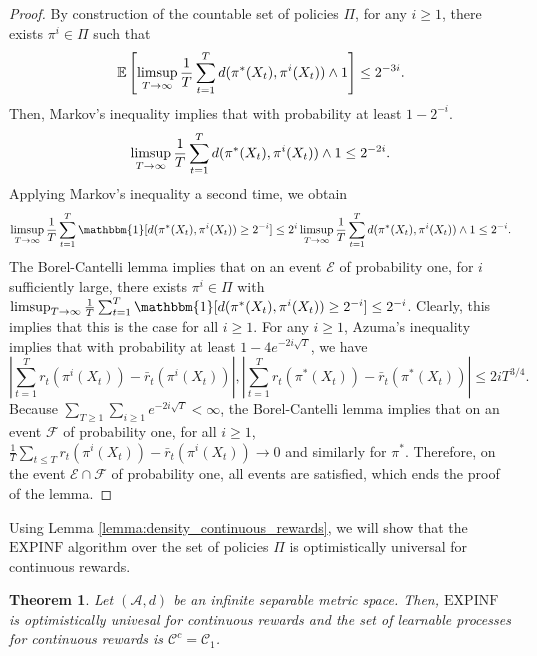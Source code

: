 \documentclass[aos]{imsart}
\theoremstyle{plain}
\newtheorem{theorem}{Theorem}[section]
\theoremstyle{remark}
\newcommand{\Acal}{\mathcal{A}}
\newcommand{\Ccal}{\mathcal{C}}
\newcommand{\Ecal}{\mathcal{E}}
\newcommand{\Fcal}{\mathcal{F}}
\newcommand{\Ebb}{\mathbb{E}}
\newcommand{\1}{\mathbbm{1}}%
\newcommand{\EXPINF}{\mathrm{EXPINF}}
\renewcommand{\limsup}{\mathop{\rm limsup}}
\begin{document}
\begin{proof}
By construction of the countable set of policies $\Pi$, for any $i\geq 1$, there exists $\pi^i\in \Pi$ such that
\begin{equation*}
    \Ebb\left[\limsup_{T\to\infty}\frac{1}{T}\sum_{t=1}^T d(\pi^*(X_t),\pi^i(X_t))\wedge 1\right] \leq 2^{-3i}.
\end{equation*}
Then, Markov's inequality implies that with probability at least $1-2^{-i}$.
\begin{equation*}
    \limsup_{T\to\infty}\frac{1}{T}\sum_{t=1}^T d(\pi^*(X_t),\pi^i(X_t))\wedge 1 \leq 2^{-2i}.
\end{equation*}
Applying Markov's inequality a second time, we obtain
\begin{equation*}
    \limsup_{T\to\infty}\frac{1}{T} \sum_{t=1}^T \1[d(\pi^*(X_t),\pi^i(X_t)) \geq 2^{-i}] \leq 2^i \limsup_{T\to\infty}\frac{1}{T} \sum_{t=1}^T d(\pi^*(X_t),\pi^i(X_t))\wedge 1  \leq 2^{-i}.
\end{equation*}
The Borel-Cantelli lemma implies that on an event $\Ecal$ of probability one, for $i$ sufficiently large, there exists $\pi^i\in\Pi$ with $\limsup_{T\to\infty}\frac{1}{T} \sum_{t=1}^T \1[d(\pi^*(X_t),\pi^i(X_t)) \geq 2^{-i}] \leq 2^{-i}$. Clearly, this implies that this is the case for all $i\geq 1$. For any $i\geq 1$, Azuma's inequality implies that with probability at least $1-4e^{-2i\sqrt T}$, we have
\begin{equation*}
    \left|\sum_{t=1}^T r_t(\pi^i(X_t))-\bar r_t(\pi^i(X_t))\right|, \left|\sum_{t=1}^T r_t(\pi^*(X_t))-\bar r_t(\pi^*(X_t))\right| \leq  2i T^{3/4}.
\end{equation*}
Because $\sum_{T\geq 1}\sum_{i\geq 1}e^{-2i\sqrt T}<\infty$, the Borel-Cantelli lemma implies that on an event $\Fcal$ of probability one, for all $i\geq 1$, $\frac{1}{T}\sum_{t\leq T}r_t(\pi^i(X_t))-\bar r_t(\pi^i(X_t))\to 0$ and similarly for $\pi^*$. Therefore, on the event $\Ecal\cap\Fcal$ of probability one, all events are satisfied, which ends the proof of the lemma.
\end{proof}


Using Lemma \ref{lemma:density_continuous_rewards}, we will show that the $\EXPINF$ algorithm over the set of policies $\Pi$ is optimistically universal for continuous rewards.

\begin{theorem}\label{thm:continuous_rewards_C1}
Let $(\Acal,d)$ be an infinite separable metric space. Then, $\EXPINF$ is optimistically univesal for continuous rewards and the set of learnable processes for continuous rewards is $\Ccal ^{c} = \Ccal_1$.
\end{theorem}
\end{document}
